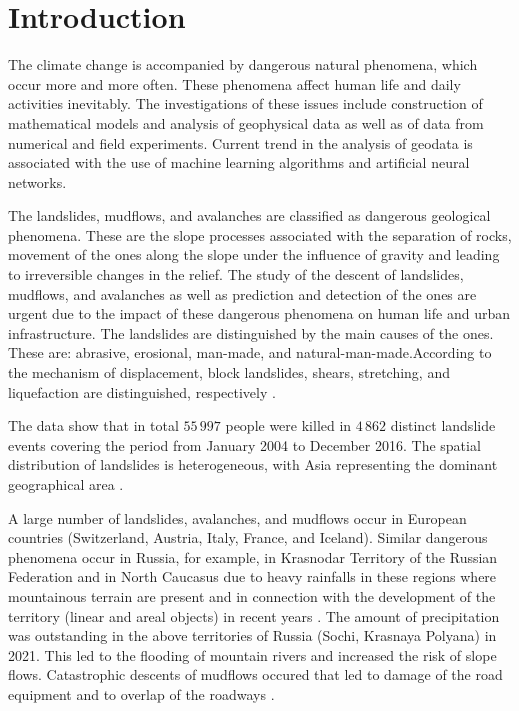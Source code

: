 \documentclass[applsci,article,submit,moreauthors,pdftex]{Definitions/mdpi}
\begin{document}
\section{Introduction}

The climate change is accompanied by dangerous natural phenomena, which occur more and more often. These phenomena affect human life and daily activities inevitably. The investigations of these issues include construction of mathematical models and analysis of geophysical data as well as of data from numerical and field experiments. Current trend in the analysis of geodata is associated with the use of machine learning algorithms and artificial neural networks.

The landslides, mudflows, and avalanches are classified as dangerous geological phenomena. These are the slope processes associated with the separation of rocks, movement of the ones along the slope under the influence of gravity and leading to irreversible changes in the relief. The study of the descent of landslides, mudflows, and avalanches as well as prediction and detection of the ones are urgent due to the impact of these dangerous phenomena on human life and urban infrastructure. The landslides are distinguished by the main causes of the ones. These are: abrasive, erosional, man-made, and natural-man-made.According to the mechanism of displacement, block landslides, shears, stretching, and liquefaction are distinguished, respectively \cite{Pendin2015}.

The data show that in total $55\,997$ people were killed in $4\,862$ distinct landslide events covering the period from January 2004 to December 2016. The spatial distribution of landslides is heterogeneous, with Asia representing the dominant geographical area \cite{Froude2018}.

A large number of landslides, avalanches, and mudflows occur in European countries (Switzerland, Austria, Italy, France, and Iceland). Similar dangerous phenomena occur in Russia, for example, in Krasnodar Territory of the Russian Federation and in  North Caucasus due to heavy rainfalls in these regions where mountainous terrain are present and in connection with the development of the territory (linear and areal objects) in recent years \cite{hungr2005landslide}.  The amount of precipitation was outstanding in the above territories of Russia (Sochi, Krasnaya Polyana) in 2021. This led to the flooding of mountain rivers and increased the risk of slope flows. Catastrophic descents of mudflows occured that led to damage of the road equipment and to overlap of the roadways \cite{Harch2020}.
\end{document}
